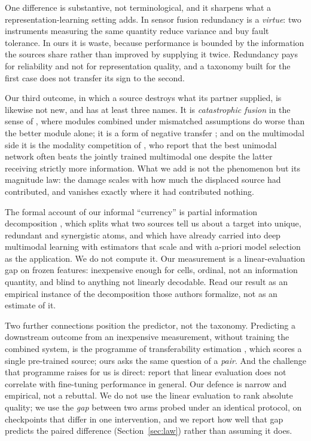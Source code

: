One difference is substantive, not terminological, and it sharpens
what a representation-learning setting adds. In sensor fusion redundancy is
a \emph{virtue}: two instruments measuring the same quantity reduce
variance and buy fault tolerance. In ours it is waste, because performance
is bounded by the information the sources share rather than improved by
supplying it twice. Redundancy pays for reliability and not for
representation quality, and a taxonomy built for the first case does not
transfer its sign to the second.

Our third outcome, in which a source destroys what its partner supplied,
is likewise not new, and has at least three names. It is \emph{catastrophic
fusion} in the sense of \citet{movellan1997catastrophic}, where modules
combined under mismatched assumptions do worse than the better module
alone; it is a form of negative transfer
\citep{wang2019negative}; and on the multimodal side it
is the modality competition of \citet{wang2020multimodal}, who report that
the best unimodal network often beats the jointly trained multimodal one
despite the latter receiving strictly more information. What we add is not
the phenomenon but its magnitude law: the damage scales with how much the
displaced source had contributed, and vanishes exactly where it had
contributed nothing.

The formal account of our informal ``currency'' is partial information
decomposition \citep{williams2010nonnegative}, which splits what two
sources tell us about a target into unique, redundant and synergistic
atoms, and which \citet{liang2023quantifying} have already carried into
deep multimodal learning with estimators that scale and with a-priori model
selection as the application. We do not compute it. Our measurement is a
linear-evaluation gap on frozen features: inexpensive enough for \computeCells{} cells, ordinal, not an information quantity, and blind to anything not
linearly decodable. Read our result as an empirical instance of the
decomposition those authors formalize, not as an estimate of it.

Two further connections position the predictor, not the taxonomy.
Predicting a downstream outcome from an inexpensive measurement, without training
the combined system, is the programme of transferability estimation
\citep{nguyen2020leep}, which scores a single pre-trained
source; ours asks the same question of a \emph{pair}. And the challenge
that programme raises for us is direct:
\citet{newell2020useful} report that linear evaluation does not correlate
with fine-tuning performance in general. Our defence is narrow and empirical, not a rebuttal. We do not use the linear evaluation to
rank absolute quality; we use the \emph{gap} between two arms probed under
an identical protocol, on checkpoints that differ in one intervention, and
we report how well that gap predicts the paired difference
(Section~\ref{sec:law}) rather than assuming it does.

